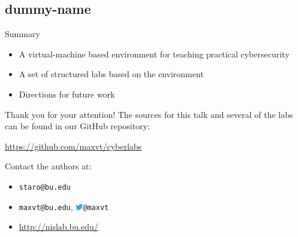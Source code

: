 \documentclass{beamer}
\begin{document}
	\subsection{dummy-name}	
	\begin{frame}{Summary}
		\begin{itemize}
			\item	A virtual-machine based environment for teaching practical cybersecurity
			\pause			
			\item A set of structured labs based on the environment
			\pause
			\item Directions for future work
		\end{itemize}
	\end{frame}
	
	\begin{frame}{Thank you for your attention!}
		The sources for this talk and several of the labs can be found in our GitHub repository:
		\vfill
		\begin{center}
		\url{https://github.com/maxvt/cyberlabs}
		\end{center}
		\vfill
		Contact the authors at:
		\begin{itemize}
			\item \texttt{staro@bu.edu}
			\item \texttt{maxvt@bu.edu}, \includegraphics[width=9pt]{Twitter_bird_logo_2012.png}\hspace{0.2em}\texttt{@maxvt}
			\item \url{http://nislab.bu.edu/}
		\end{itemize}	
	\end{frame}
\end{document}
